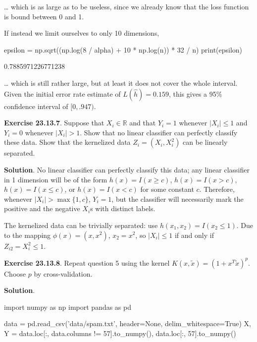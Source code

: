 \ldots{} which is as large as to be useless, since we already know that
the loss function is bound between 0 and 1.

If instead we limit ourselves to only 10 dimensions,

\begin{python}
epsilon = np.sqrt((np.log(8 / alpha) + 10 * np.log(n)) * 32 / n)
print(epsilon)
\end{python}

\begin{console}
0.7885971226771238
\end{console}

\ldots{} which is still rather large, but at least it does not cover the
whole interval. Given the initial error rate estimate of
\(L(\hat{h}) = 0.159\), this gives a 95\% confidence interval of
\([0, .947)\).

\textbf{Exercise 23.13.7}. Suppose that \(X_{i} \in \mathbb{R}\) and that
\(Y_{i} = 1\) whenever \(|X_{i}| \leq 1\) and \(Y_{i} = 0\) whenever
\(|X_{i}| > 1\). Show that no linear classifier can perfectly classify
these data. Show that the kernelized data \(Z_{i} = (X_{i}, X_{i}^{2})\) can be
linearly separated.

\textbf{Solution}. No linear classifier can perfectly classify this
data; any linear classifier in 1 dimension will be of the form
\(h(x) = I(x \geq c)\), \(h(x) = I(x > c)\), \(h(x) = I(x \leq c)\), or
\(h(x) = I(x < c)\) for some constant \(c\). Therefore, whenever
\(|X_{i}| > \max \{ 1, c \}\), \(Y_{i} = 1\), but the classifier will
necessarily mark the positive and the negative \(X_{i}\)s with distinct
labels.

The kernelized data can be trivially separated: use
\(h(x_{1}, x_{2}) = I(x_{2} \leq 1)\). Due to the mapping
\(\phi(x) = (x, x^{2})\), \(x_{2} = x^{2}\), so \(|X_{i}| \leq 1\) if and only
if \(Z_{i2} = X_{i}^{2} \leq 1\).

\textbf{Exercise 23.13.8}. Repeat question 5 using the kernel
\(K(x, \tilde{x}) = (1 + x^T\tilde{x})^p\). Choose \(p\) by
cross-validation.

\textbf{Solution}.

\begin{python}
import numpy as np
import pandas as pd

data = pd.read_csv('data/spam.txt', header=None, delim_whitespace=True)
X, Y = data.loc[:, data.columns != 57].to_{n}umpy(), data.loc[:, 57].to_{n}umpy()
\end{python}

